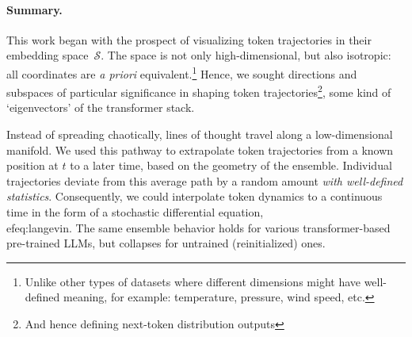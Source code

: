 \documentclass{article} %
\begin{document}





\paragraph{Summary.}
This work began with the prospect of visualizing token trajectories in their embedding space~$\mathcal{S}$.
The space is not only high-dimensional, but also isotropic: all coordinates are \textit{a priori} equivalent.\footnote{Unlike other types of datasets where different dimensions might have well-defined meaning, for example: temperature, pressure, wind speed, etc.} 
Hence, we sought directions and subspaces of particular significance in shaping token trajectories\footnote{And hence defining next-token distribution outputs}, some kind of `eigenvectors' of the transformer stack.

Instead of spreading chaotically, lines of thought travel along a low-dimensional manifold.
We used this pathway to extrapolate token trajectories from a known position at $t$ to a later time, based on the geometry of the ensemble. Individual trajectories deviate from this average path by a random amount \emph{with well-defined statistics}. 
Consequently, we could interpolate token dynamics to a continuous time in the form of a stochastic differential equation, \\ef{eq:langevin}. 
The same ensemble behavior holds for various transformer-based pre-trained LLMs, but collapses for untrained (reinitialized) ones.
\end{document}
